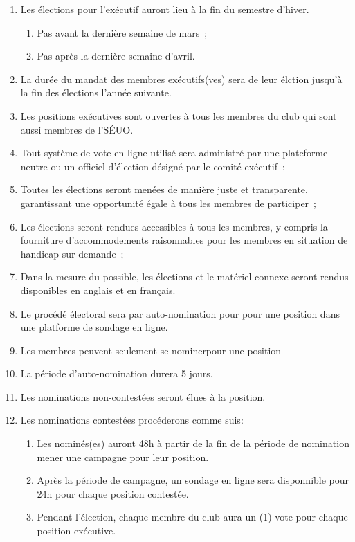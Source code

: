 \begin{enumerate}
    \item Les élections pour l'exécutif auront lieu à la fin du semestre d'hiver.
    \begin{enumerate}
        \item Pas avant la dernière semaine de mars~;
        \item Pas après la dernière semaine d'avril.
    \end{enumerate}
    \item La durée du mandat des membres exécutifs(ves) sera de leur élction jusqu'à la fin des élections l'année suivante.
    \item Les positions exécutives sont ouvertes à tous les membres du club qui sont aussi membres de l'SÉUO.
    \item Tout système de vote en ligne utilisé sera administré par une plateforme neutre ou un officiel d'élection désigné par le comité exécutif~;
    \item Toutes les élections seront menées de manière juste et transparente, garantissant une opportunité égale à tous les membres de participer~;
    \item Les élections seront rendues accessibles à tous les membres, y compris la fourniture d'accommodements raisonnables pour les membres en situation de handicap sur demande~;
    \item Dans la mesure du possible, les élections et le matériel connexe seront rendus disponibles en anglais et en français.
    \item Le procédé électoral sera par auto-nomination pour pour une position dans une platforme de sondage en ligne.
    \item Les membres peuvent seulement se nominerpour une position
    \item La période d'auto-nomination durera 5 jours.
    \item Les nominations non-contestées seront élues à la position.
    \item Les nominations contestées procéderons comme suis:
    \begin{enumerate}
        \item Les nominés(es) auront 48h à partir de la fin de la période de nomination mener une campagne pour leur position.
        \item Après la période de campagne, un sondage en ligne sera disponnible pour 24h pour chaque position contestée.
        \item Pendant l'élection, chaque membre du club aura un (1) vote pour chaque position exécutive.

\end{enumerate}
\end{enumerate}
